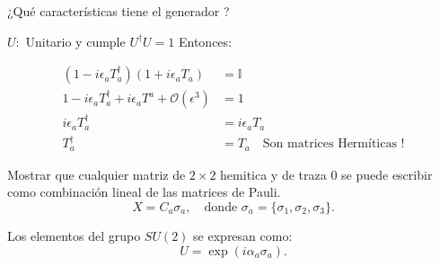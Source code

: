 \documentclass[a4paper,12pt]{article}
\begin{document}
¿Qué características tiene el generador ? 

$U : $  Unitario y cumple $U^\dagger U=1 $
Entonces: 

\begin{align*}
(1- i\epsilon_a T_a^\dagger ) (1+ i\epsilon_a T_a) &= \mathbb{I} \\
1- i\epsilon_a T_a^\dagger+i\epsilon_aT^a +\mathcal{O}(\epsilon^3 )&=1\\
i\epsilon_a T_a^\dagger &= i\epsilon_a T_a\\
T_a^\dagger &= T_a \quad \text{Son matrices Hermíticas !}
\end{align*}

 


 

\begin{tcolorbox}[colback=yellow!10, colframe=red!20!black, title=Ejercicio (Este implica mayor importancia)  ] 
Mostrar que cualquier matriz de $2\times 2$ hemitica y de traza 0 se puede escribir como combinación lineal de las matrices de Pauli.  \[
   X = C_a \sigma_a, \quad \text{donde } \sigma_a = \{\sigma_1, \sigma_2, \sigma_3\}.
   \] 
   
   Los elementos del grupo $SU(2)$ se expresan como:  
   \[
   U = \exp\left(i \alpha_a \sigma_a\right).
   \]


\end{tcolorbox}
\end{document}
